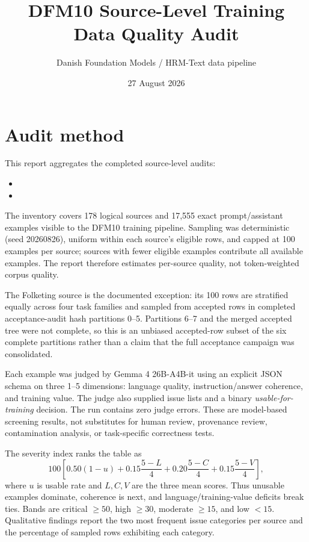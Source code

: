 \documentclass[10pt,a4paper]{article}
\title{DFM10 Source-Level Training Data Quality Audit}
\author{Danish Foundation Models / HRM-Text data pipeline}
\date{27 August 2026}
\begin{document}
\maketitle

\section*{Audit method}
This report aggregates the completed source-level audits:
\begin{itemize}
\item {}
\item {}
\end{itemize}
The inventory covers 178 logical sources and
17,555 exact prompt/assistant examples visible to the DFM10 training pipeline.
Sampling was deterministic (seed 20260826), uniform within each source's eligible
rows, and capped at 100 examples per source; sources with fewer eligible examples
contribute all available examples. The report therefore estimates per-source
quality, not token-weighted corpus quality.

The Folketing source is the documented exception: its 100 rows are stratified
equally across four task families and sampled from accepted rows in completed
acceptance-audit hash partitions 0--5. Partitions 6--7 and the merged accepted
tree were not complete, so this is an unbiased accepted-row subset of the six
complete partitions rather than a claim that the full acceptance campaign was
consolidated.

Each example was judged by Gemma 4 26B-A4B-it using an explicit JSON schema on
three 1--5 dimensions: language quality, instruction/answer coherence, and
training value. The judge also supplied issue lists and a binary
\emph{usable-for-training} decision. The run contains zero judge errors. These
are model-based screening results, not substitutes for human review, provenance
review, contamination analysis, or task-specific correctness tests.

The severity index ranks the table as
\[
100\left[0.50(1-u)+0.15\frac{5-L}{4}+0.20\frac{5-C}{4}+
0.15\frac{5-V}{4}\right],
\]
where $u$ is usable rate and $L,C,V$ are the three mean scores. Thus unusable
examples dominate, coherence is next, and language/training-value deficits break
ties. Bands are critical $\geq50$, high $\geq30$, moderate $\geq15$, and low
$<15$. Qualitative findings report the two most frequent issue categories per
source and the percentage of sampled rows exhibiting each category.
\end{document}
